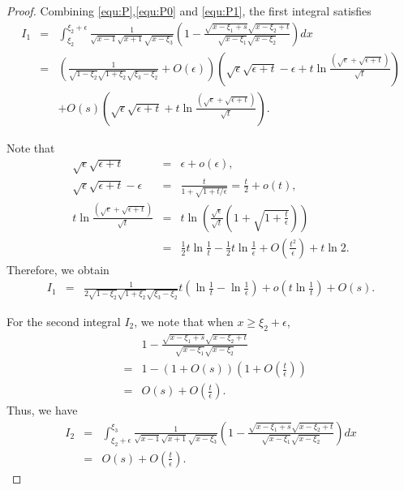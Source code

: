 \documentclass[11pt]{amsart}
\theoremstyle{plain}
\begin{document}
\begin{proof}
Combining \eqref{equ:P},\eqref{equ:P0} and \eqref{equ:P1},  the first integral satisfies
\begin{eqnarray*}
 I_1 &=& \int_{\xi_2}^{\xi_2+\epsilon}\frac{1}{\sqrt{x-1}\sqrt{x+1}\sqrt{x-\xi_3}}
\left(1-\frac{\sqrt{x-\xi_1+s}\sqrt{x-\xi_2+t}}{\sqrt{x-\xi_1}\sqrt{x-\xi_2}}\right)dx  \nonumber  \\
&=& \left( \frac{1}{\sqrt{1-\xi_2}\sqrt{1+\xi_2}\sqrt{\xi_3-\xi_2}} +O(\epsilon)\right) \left( \sqrt{\epsilon}\sqrt{\epsilon+t}-\epsilon+t\ln \frac{(\sqrt{\epsilon}+\sqrt{\epsilon+t})}{\sqrt{t}} \right) \nonumber \\
&&+ O(s) \left( \sqrt{\epsilon}\sqrt{\epsilon+t} +t\ln \frac{(\sqrt{\epsilon}+\sqrt{\epsilon+t})}{\sqrt{t}} \right) .
\end{eqnarray*}

Note that 
\begin{eqnarray*}
 \sqrt{\epsilon}\sqrt{\epsilon+t} &=& \epsilon + o(\epsilon), \\
  \sqrt{\epsilon}\sqrt{\epsilon+t}-\epsilon &=& \frac{t}{1+\sqrt{1+t/\epsilon}}= \frac{t}{2}+o(t),\\
  t\ln \frac{(\sqrt{\epsilon}+\sqrt{\epsilon+t})}{\sqrt{t}} &=&t\ln\left(\frac{\sqrt{\epsilon}}{\sqrt{t}}\left(1+\sqrt{1+\frac{t}{\epsilon}}\right)\right)\\&=& \frac{1}{2}t\ln \frac{1}{t} - \frac{1}{2}t\ln \frac{1}{\epsilon} + O\left(\frac{t^2}{\epsilon}\right)+t\ln 2. 
\end{eqnarray*}
Therefore, we obtain
\begin{eqnarray}\label{equ:P2}
I_1&=&\frac{1}{2\sqrt{1-\xi_2}\sqrt{1+\xi_2}\sqrt{\xi_3-\xi_2}} t\left(\ln \frac{1}{t}-\ln \frac{1}{\epsilon}\right)+ o\left(t\ln \frac{1}{t}\right)+O(s).
\end{eqnarray}

For the second integral $I_2$, we note that when $x\geq \xi_2+\epsilon$, 
\begin{eqnarray*}
 && 1-\frac{\sqrt{x-\xi_1+s}\sqrt{x-\xi_2+t}}{\sqrt{x-\xi_1}\sqrt{x-\xi_2}} \\
 &=& 1- \left(1+O(s)\right)\left( 1+ O\left(\frac{t}{\epsilon}\right)\right) \\
 &=& O(s)+ O \left( \frac{t}{\epsilon}\right) .
\end{eqnarray*} 
Thus, we have 
\begin{eqnarray}\label{equ:P3}
I_2&=&\int_{\xi_2+\epsilon}^{\xi_3}\frac{1}{\sqrt{x-1}\sqrt{x+1}\sqrt{x-\xi_3}}
\left(1-\frac{\sqrt{x-\xi_1+s}\sqrt{x-\xi_2+t}}{\sqrt{x-\xi_1}\sqrt{x-\xi_2}}\right)dx \nonumber \\
&=& O\left(s\right)+O\left(\frac{t}{\epsilon}\right).
\end{eqnarray}


\end{proof}
\end{document}
